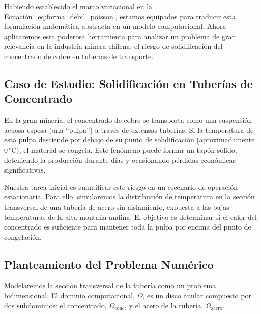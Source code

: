 Habiendo establecido el marco variacional en la Ecuación~\cref{eq:forma_debil_poisson}, estamos equipados para traducir esta formulación matemática abstracta en un modelo computacional. Ahora aplicaremos esta poderosa herramienta para analizar un problema de gran relevancia en la industria minera chilena: el riesgo de solidificación del concentrado de cobre en tuberías de transporte.

\subsection{Caso de Estudio: Solidificación en Tuberías de Concentrado}
En la gran minería, el concentrado de cobre se transporta como una suspensión acuosa espesa (una ``pulpa'') a través de extensas tuberías. Si la temperatura de esta pulpa desciende por debajo de su punto de solidificación (aproximadamente \(0 \, ^\circ\text{C}\)), el material se congela. Este fenómeno puede formar un tapón sólido, deteniendo la producción durante días y ocasionando pérdidas económicas significativas.

Nuestra tarea inicial es cuantificar este riesgo en un escenario de operación estacionaria. Para ello, simularemos la distribución de temperatura en la sección transversal de una tubería de acero sin aislamiento, expuesta a las bajas temperaturas de la alta montaña andina. El objetivo es determinar si el calor del concentrado es suficiente para mantener toda la pulpa por encima del punto de congelación.

\subsection{Planteamiento del Problema Numérico}
Modelaremos la sección transversal de la tubería como un problema bidimensional. El dominio computacional, \(\Omega\), es un disco anular compuesto por dos subdominios: el concentrado, \(\Omega_{\text{conc}}\), y el acero de la tubería, \(\Omega_{\text{acero}}\).

